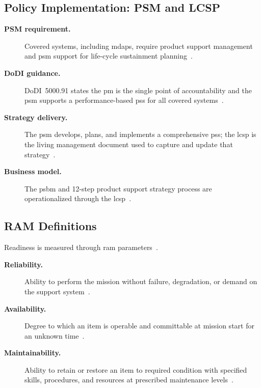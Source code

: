 \documentclass[../main.tex]{subfiles}
\begin{document}
\subsection{Policy Implementation: PSM and LCSP}
\begin{description}
  \item[\textbf{PSM requirement.}] Covered systems, including \acp{mdap}, require product support management and \ac{psm} support for life-cycle sustainment planning~\autocite{edo-3-5-4-acquisition-logistics-2025,DoDI5000-91}.
  \item[\textbf{DoDI guidance.}] DoDI~5000.91 states the \ac{pm} is the single point of accountability and the \ac{psm} supports a performance-based \ac{pss} for all covered systems~\autocite{edo-3-5-4-acquisition-logistics-2025,DoDI5000-91}.
  \item[\textbf{Strategy delivery.}] The \ac{psm} develops, plans, and implements a comprehensive \ac{pss}; the \ac{lcsp} is the living management document used to capture and update that strategy~\autocite{edo-3-5-4-acquisition-logistics-2025,DoDI5000-91}.
  \item[\textbf{Business model.}] The \ac{psbm} and 12-step product support strategy process are operationalized through the \ac{lcsp}~\autocite{edo-3-5-4-acquisition-logistics-2025}.
\end{description}


\subsection{RAM Definitions}
Readiness is measured through \ac{ram} parameters~\autocite{edo-3-5-4-acquisition-logistics-2025}.
\begin{description}
  \item[\textbf{Reliability.}] Ability to perform the mission without failure, degradation, or demand on the support system~\autocite{edo-3-5-4-acquisition-logistics-2025}.
  \item[\textbf{Availability.}] Degree to which an item is operable and committable at mission start for an unknown time~\autocite{edo-3-5-4-acquisition-logistics-2025}.
  \item[\textbf{Maintainability.}] Ability to retain or restore an item to required condition with specified skills, procedures, and resources at prescribed maintenance levels~\autocite{edo-3-5-4-acquisition-logistics-2025}.
\end{description}
\end{document}
